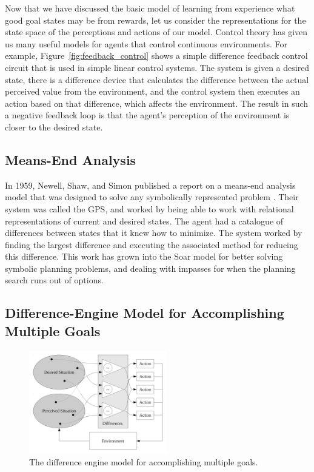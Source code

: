 Now that we have discussed the basic model of learning from experience
what good goal states may be from rewards, let us consider the
representations for the state space of the perceptions and actions of
our model.  Control theory has given us many useful models for agents
that control continuous environments.  For example,
Figure~\ref{fig:feedback_control} shows a simple difference feedback
control circuit that is used in simple linear control systems.  The
system is given a desired state, there is a difference device that
calculates the difference between the actual perceived value from the
environment, and the control system then executes an action based on
that difference, which affects the environment.  The result in such a
negative feedback loop is that the agent's perception of the
environment is closer to the desired state.

\subsection{Means-End Analysis}

In 1959, Newell, Shaw, and Simon published a report on a means-end
analysis model that was designed to solve any symbolically represented
problem \citep{newell:1959}.  Their system was called the \ac{GPS},
and worked by being able to work with relational representations of
current and desired states.  The agent had a catalogue of differences
between states that it knew how to minimize.  The system worked by
finding the largest difference and executing the associated method for
reducing this difference.  This work has grown into the Soar model
\citep{newell:1990} for better solving symbolic planning problems, and
dealing with impasses for when the planning search runs out of
options.

\subsection{Difference-Engine Model for Accomplishing Multiple Goals}

\begin{figure}[bth]
  \center
  \includegraphics[width=6cm]{gfx/difference_engine_feedback_control}
  \caption[The difference engine model for accomplishing multiple goals]{The difference engine model for accomplishing multiple goals.}
  \label{fig:difference_engine_feedback_control}
\end{figure}





